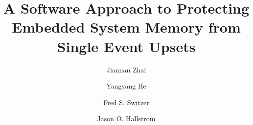 \documentclass[runningheads,a4paper]{llncs}
\begin{document}
\mainmatter  %

\date{}

\title{\Large \bf A Software Approach to Protecting Embedded System Memory from Single Event Upsets}


%
%

\vspace{-40pt}

\author{Jiannan Zhai%
\and Yangyang He\and Fred S. Switzer\and Jason O. Hallstrom}
%
\authorrunning{}

\vspace{-40pt}


%
%

\toctitle{}
\tocauthor{}
\maketitle

\vspace{-30pt}




%




\vspace{-10pt}
{\scriptsize 
	}
\end{document}
